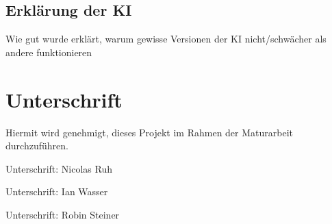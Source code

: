 \documentclass{article}
\begin{document}
\subsection{Erklärung der KI}
\label{chap:erklaerung}
Wie gut wurde erklärt, warum gewisse Versionen der KI nicht/schwächer als andere funktionieren




\section{Unterschrift}
\label{chap:unterschrift}

Hiermit wird genehmigt, dieses Projekt im Rahmen der Maturarbeit
durchzuführen.

\vspace*{1cm}

Unterschrift: \hrulefill Nicolas Ruh \vspace*{2cm}

Unterschrift: \hrulefill Ian Wasser \vspace*{2cm}

Unterschrift: \hrulefill Robin Steiner \vspace*{2cm}

\printbibliography[heading=bibintoc]
\end{document}
